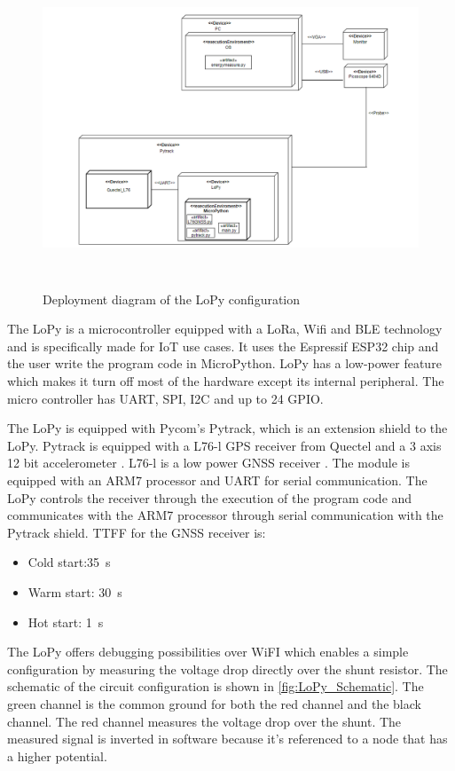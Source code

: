 \begin{figure}[H]
\centering
\includegraphics[height=9.5cm]{Project_Report/Images/LoPy_deploy.png}
\caption{Deployment diagram of the LoPy configuration}
\label{fig:LoPy_deploy}
\end{figure}

The LoPy is a microcontroller equipped with a LoRa, Wifi and BLE technology \cite{LoPy} and is specifically made for IoT use cases. It uses the Espressif ESP32 chip and the user write the program code in MicroPython. LoPy has a low-power feature which makes it turn off most of the hardware except its internal peripheral. The micro controller has UART, SPI, I2C and up to 24 GPIO.

The LoPy is equipped with Pycom's Pytrack, which is an extension shield to the LoPy. Pytrack is equipped with a L76-l GPS receiver from Quectel and a 3 axis 12 bit 
accelerometer \cite{Pytrack}. L76-l is a low power GNSS receiver \cite{L76}. The module is equipped with an ARM7 processor and UART for serial communication. The LoPy controls the receiver through the execution of the program code and communicates with the ARM7 processor through serial communication with the Pytrack shield. TTFF for the GNSS receiver is:
\begin{itemize}
\item Cold start:35 \,s
\item Warm start: 30 \,s
\item Hot start: 1 \,s


\end{itemize}


The LoPy offers debugging possibilities over WiFI which enables a simple configuration by measuring the voltage drop directly over the shunt resistor. The schematic of the circuit configuration is shown in \ref{fig:LoPy_Schematic}. The green channel is the common ground for both the red channel and the black channel. The red channel measures the voltage drop over the shunt. The measured signal is inverted in software because it's referenced to a node that has a higher potential. 


